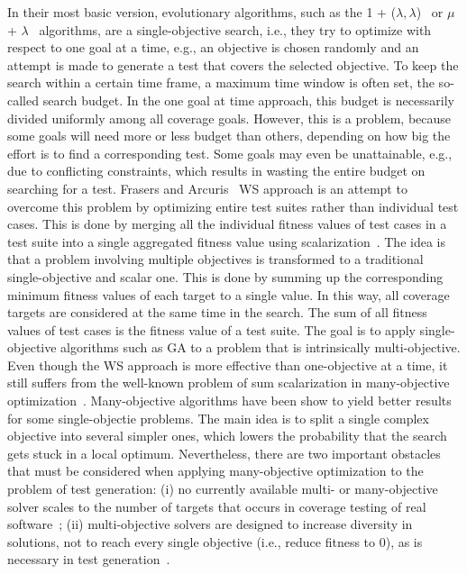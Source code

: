 \documentclass{article}
\begin{document}
In their most basic version, evolutionary algorithms, such as the 1 + ($\lambda,\lambda$)~\cite{Doerr2015} or $\mu$ + $\lambda$~\cite{TerSarkisov2011} algorithms, are a single-objective search, i.e., they try to optimize with respect to one goal at a time, e.g., an objective is chosen randomly and an attempt is made to generate a test that covers the selected objective. To keep the search within a certain time frame, a maximum time window is often set, the so-called search budget. In the one goal at time approach, this budget is necessarily divided uniformly among all coverage goals. However, this is a problem, because some goals will need more or less budget than others, depending on how big the effort is to find a corresponding test. Some goals may even be unattainable, e.g., due to conflicting constraints, which results in wasting the entire budget on searching for a test. Frasers and Arcuris~\cite{Fraser_2013} \ac{WS} approach is an attempt to overcome this problem by optimizing entire test suites rather than individual test cases. This is done by merging all the individual fitness values of test cases in a test suite into a single aggregated fitness value using scalarization~\cite{Deb2014}. The idea is that a problem involving multiple objectives is transformed to a traditional single-objective and scalar one. This is done by summing up the corresponding minimum fitness values of each target to a single value. In this way, all coverage targets are considered at the same time in the search. The sum of all fitness values of test cases is the fitness value of a test suite. The goal is to apply single-objective algorithms such as \ac{GA} to a problem that is intrinsically multi-objective. Even though the \ac{WS} approach is more effective than one-objective at a time, it still suffers from the well-known problem of sum scalarization in many-objective optimization~\cite{Deb2014}. Many-objective algorithms have been show to yield better results for some single-objectie problems. The main idea is to split a single complex objective into several simpler ones, which lowers the probability that the search gets stuck in a local optimum. Nevertheless, there are two important obstacles that must be considered when applying many-objective optimization to the problem of test generation: (i) no currently available multi- or many-objective solver scales to the number of targets that occurs in coverage testing of real software~\cite{Arcuri_2014}; (ii) multi-objective solvers are designed to increase diversity in solutions, not to reach every single objective (i.e., reduce fitness to 0), as is necessary in test generation~\cite{Panichella2018}. 
\end{document}
